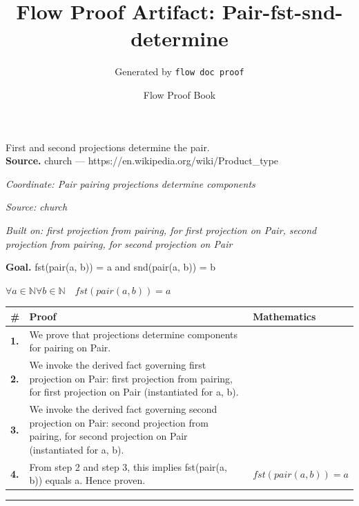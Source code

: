 \documentclass[11pt]{article}
\title{Flow Proof Artifact: Pair-fst-snd-determine}
\author{Generated by \texttt{flow doc proof}}
\date{Flow Proof Book}
\theoremstyle{definition}
\begin{document}
\maketitle
First and second projections determine the pair.\\[0.5em]
\textbf{Source.} church — https://en.wikipedia.org/wiki/Product\_type\\[0.5em]
\bigskip
{}\par
\smallskip\noindent\textit{Coordinate: Pair \cdot pairing \cdot projections determine components}\par
\smallskip\noindent\textit{Source: church}\par
\smallskip\noindent\textit{Built on: first projection from pairing, for first projection on Pair, second projection from pairing, for second projection on Pair}\par
\medskip
\noindent\textbf{Goal.} fst(pair(a, b)) = a and snd(pair(a, b)) = b\par
\noindent$\displaystyle \forall a \in \mathbb{N} \forall b \in \mathbb{N}\quad fst(pair(a, b)) = a$\par
\medskip
\noindent
\begin{tabular}{@{} >{\raggedright\arraybackslash}p{} >{\raggedright\arraybackslash}p{} >{\raggedleft\arraybackslash}p{} @{}}
\textbf{\#} & \textbf{Proof} & \textbf{Mathematics} \\
\midrule
\textbf{1.} & We prove that projections determine components for pairing on Pair. & \\[0.45em]
\textbf{2.} & We invoke the derived fact governing first projection on Pair: first projection from pairing, for first projection on Pair (instantiated for a, b). & \\[0.45em]
\textbf{3.} & We invoke the derived fact governing second projection on Pair: second projection from pairing, for second projection on Pair (instantiated for a, b). & \\[0.45em]
\textbf{4.} & From step 2 and step 3, this implies fst(pair(a, b)) equals a. Hence proven. & $\displaystyle fst(pair(a, b)) = a$ \\[0.45em]
\bottomrule
\end{tabular}
\label{thm:Pair-pairing-projections_determine_components}
\par\medskip\hrule
\end{document}
